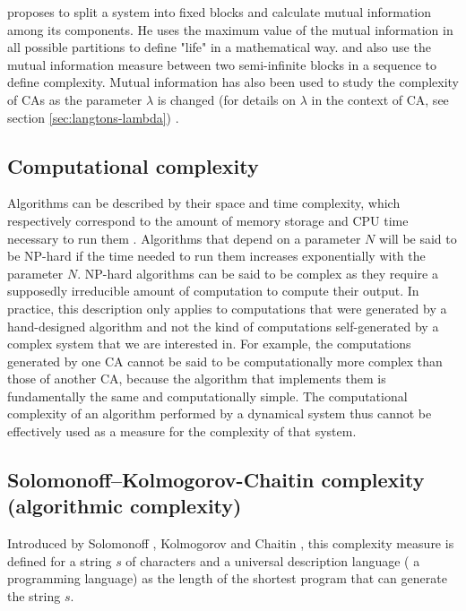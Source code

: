 \textcite{chaitinMathematicalDefinitionLife1987} proposes to split a system into
fixed blocks and calculate mutual information among its components.
He uses the maximum value of the mutual information in all possible partitions
to define "life" in a mathematical way. \textcite{shawDrippingFaucetModel1984}
and \textcite{grassbergerQuantitativeTheorySelfgenerated1986} also use the
mutual information measure between two semi-infinite blocks in a sequence to
define complexity. Mutual information has also been used to study the
complexity of \acp{CA} as the parameter $\lambda$ is changed (for details
on $\lambda$ in the context of \ac{CA}, see section \ref{sec:langtons-lambda})
\parencite{gutowitzMethodsDesigningCellular1988,
  liTransitionPhenomenaCellular1990}.


\subsection{Computational complexity}
Algorithms can be described by their space and time complexity, which
respectively correspond to the amount of memory storage and CPU time necessary
to run them \parencite{traubInformationUncertaintyComplexity1983,
  packelRecentDevelopmentsInformationbased1987,
  hopcroftIntroductionAutomataTheory2007}. Algorithms that depend on a parameter
$N$ will be said to be NP-hard if the time needed to run them increases
exponentially with the parameter $N$. NP-hard algorithms can be said to be
complex as they require a supposedly irreducible amount of computation to
compute their output. In practice, this description only applies to computations
that were generated by a hand-designed algorithm and not the kind of
computations self-generated by a complex system that we are interested in. For
example, the computations generated by one \ac{CA} cannot be said to be
computationally more complex than those of another \ac{CA}, because the algorithm that
implements them is fundamentally the same and computationally simple. The
computational complexity of an algorithm performed by a dynamical system thus
cannot be effectively used as a measure for the complexity of that system.

\subsection{Solomonoff–Kolmogorov-Chaitin complexity (algorithmic
  complexity)}\label{sec:algo-complexity}

Introduced by Solomonoff \parencite{solomonoffPreliminaryReportGeneral1960},
Kolmogorov \parencite{kolmogorovThreeApproachesQuantitative1968} and Chaitin
\parencite{chaitinLengthProgramsComputing1969,
  chaitinAlgorithmicInformationTheory1977,
  chaitinInformationRandomnessIncompleteness1990}, this complexity measure is
defined for a string $s$ of characters and a universal description language (\eg
a programming language) as the length of the shortest program that can generate
the string $s$.

